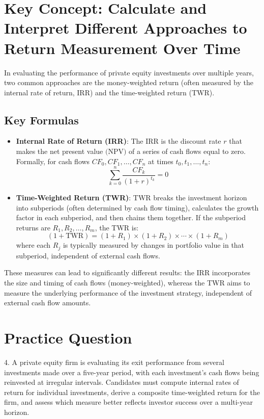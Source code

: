 \section*{Key Concept: Calculate and Interpret Different Approaches to Return Measurement Over Time}

In evaluating the performance of private equity investments over multiple years, two common approaches are the money-weighted return (often measured by the internal rate of return, IRR) and the time-weighted return (TWR). 

\subsection*{Key Formulas}

\begin{itemize}
\item \textbf{Internal Rate of Return (IRR)}: The IRR is the discount rate \(r\) that makes the net present value \(\text{(NPV)}\) of a series of cash flows equal to zero. Formally, for cash flows \(CF_0, CF_1, \dots, CF_n\) at times \(t_0, t_1, \dots, t_n\):
\[
\sum_{k=0}^{n} \frac{CF_k}{(1 + r)^{t_k}} = 0
\]
\item \textbf{Time-Weighted Return (TWR)}: TWR breaks the investment horizon into subperiods (often determined by cash flow timing), calculates the growth factor in each subperiod, and then chains them together. If the subperiod returns are \(R_1, R_2, \dots, R_m\), the TWR is:
\[
(1 + \text{TWR}) = (1 + R_1) \times (1 + R_2) \times \cdots \times (1 + R_m) 
\]
where each \(R_j\) is typically measured by changes in portfolio value in that subperiod, independent of external cash flows.
\end{itemize}

These measures can lead to significantly different results: the IRR incorporates the size and timing of cash flows (money-weighted), whereas the TWR aims to measure the underlying performance of the investment strategy, independent of external cash flow amounts.

\section*{Practice Question}

4. A private equity firm is evaluating its exit performance from several investments made over a five-year period, with each investment's cash flows being reinvested at irregular intervals. Candidates must compute internal rates of return for individual investments, derive a composite time-weighted return for the firm, and assess which measure better reflects investor success over a multi-year horizon.

